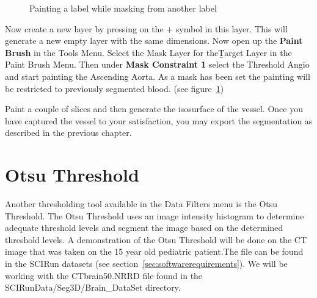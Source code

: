 \documentclass[fleqn,11pt,openany]{book}
\begin{document}
\begin{figure}
\caption{Painting a label while masking from another label}\label{fig:MaskedPainting}
\end{figure}

Now create a new layer by pressing on the $+$ symbol in this layer. This will generate a new empty layer with the same dimensions. Now open up the {\bf Paint Brush} in the Tools Menu. Select the Mask Layer for the{\b Target Layer} in the Paint Brush Menu. Then under {\bf Mask Constraint 1} select the Threshold Angio and start painting the Ascending Aorta. As a mask has been set the painting will be restricted to previously segmented blood. (see figure~\ref{fig:MaskedPainting})

Paint a couple of slices and then generate the isosurface of the vessel. Once you have captured the vessel to your satisfaction, you may export the segmentation as described in the previous chapter.

\section{Otsu Threshold}

Another thresholding tool available in the Data Filters menu is the Otsu Threshold. The Otsu Threshold uses an image intensity histogram to determine adequate threshold levels and segment the image based on the determined threshold levels. A demonstration of the Otsu Threshold will be done on the CT image that was taken on the 15 year old pediatric patient.The file can be found in the SCIRun datasets (see section~\ref{sec:softwarerequirements}). We will be working with the CTbrain50.NRRD file found in the  SCIRunData/Seg3D/Brain\_DataSet directory.
\end{document}
